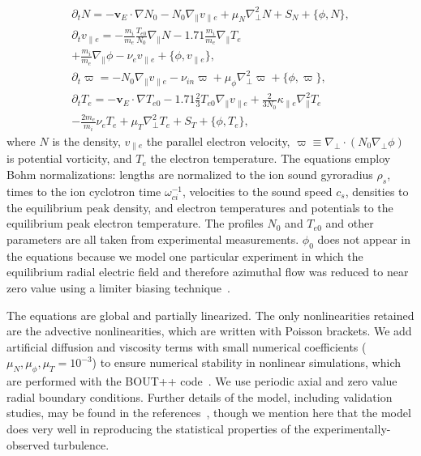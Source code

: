 \documentclass[letter,scriptaddress,twocolumn, prl,showkeys]{revtex4}
\def\beqar{\begin{eqnarray}}
\def\eeqar{\end{eqnarray}}
\newcommand{\pdt}{\partial_t}
\def\grad{\nabla}
\newcommand{\gradpar}{\grad_\parallel}
\newcommand{\gradperp}{\grad_\perp}
\newcommand{\vpe}{v_{\parallel e}}
\newcommand{\nue}{\nu_{e}}
\newcommand{\nuin}{\nu_{in}}
\newcommand{\kpe}{\kappa_{\parallel e}}
\newcommand{\fmie}{\frac{m_i}{m_e}}
\begin{document}
\beqar
\label{ni_eq}
\pdt N = - {\mathbf v_E} \cdot \grad N_0 - N_0 \gradpar \vpe + \mu_N \gradperp^2 N + S_N + \{\phi,N\}, \\
\label{ve_eq}
\pdt \vpe = - \fmie \frac{T_{e0}}{N_0} \gradpar N - 1.71 \fmie \gradpar T_e  \nonumber \\
+ \fmie \gradpar \phi - \nue \vpe + \{\phi,\vpe \}, \\
\label{rho_eq}
\pdt \varpi = - N_0 \gradpar \vpe  - \nuin \varpi + \mu_\phi \gradperp^2 \varpi + \{\phi,\varpi \}, \\
\label{te_eq}
\pdt T_e = - {\mathbf v_E} \cdot \grad T_{e0} - 1.71 \frac{2}{3} T_{e0} \gradpar \vpe + \frac{2}{3 N_0} \kpe \gradpar^2 T_e  \nonumber \\
- \frac{2 m_e}{m_i} \nue T_e  + \mu_T \gradperp^2 T_e +  S_T + \{\phi,T_e\},
\eeqar
where $N$ is the density, $\vpe$ the parallel electron velocity, $\varpi \equiv \gradperp \cdot (N_0 \gradperp \phi)$ is potential vorticity,
and $T_e$ the electron temperature. The equations employ Bohm normalizations: lengths are
normalized to the ion sound gyroradius $\rho_s$, times to the ion cyclotron time $\omega_{ci}^{-1}$, velocities to the sound speed $c_s$, densities to the equilibrium peak density, and electron
temperatures and potentials to the equilibrium peak electron temperature. The profiles $N_0$ and $T_{e0}$ and other parameters are all taken from experimental measurements. $\phi_0$ 
does not appear in the equations because we model one particular
experiment in which the equilibrium radial electric field and
therefore azimuthal flow was reduced to near zero value using a
limiter biasing technique~\cite{schaffner2012}. 

The equations are global and partially linearized. The only nonlinearities retained are the advective nonlinearities, which are written with Poisson brackets. 
We add artificial diffusion and viscosity terms with small numerical coefficients ($\mu_N, \mu_\phi, \mu_T = 10^{-3}$)
to ensure numerical stability in nonlinear simulations, which are performed with the BOUT++ code~\cite{dudson2009}. We use periodic axial and zero value radial 
boundary conditions. Further details of the model, including validation studies, may be found in the references~\cite{Popovich2010a,Popovich2010b,Umansky2011,friedman2012b,friedman2013},
though we mention here that the model does very well in reproducing
the statistical properties of the experimentally-observed turbulence.
\end{document}
